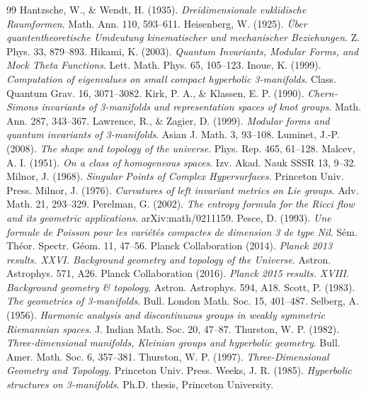 \documentclass[11pt,a4paper]{article}
\begin{document}
\begin{thebibliography}{99}
 Hantzsche, W., \& Wendt, H. (1935). \emph{Dreidimensionale euklidische Raumformen}. Math. Ann. 110, 593--611.
 Heisenberg, W. (1925). \emph{\"Uber quantentheoretische Umdeutung kinematischer und mechanischer Beziehungen}. Z. Phys. 33, 879--893.
 Hikami, K. (2003). \emph{Quantum Invariants, Modular Forms, and Mock Theta Functions}. Lett. Math. Phys. 65, 105--123.
 Inoue, K. (1999). \emph{Computation of eigenvalues on small compact hyperbolic 3-manifolds}. Class. Quantum Grav. 16, 3071--3082.
 Kirk, P. A., \& Klassen, E. P. (1990). \emph{Chern-Simons invariants of 3-manifolds and representation spaces of knot groups}. Math. Ann. 287, 343--367.
 Lawrence, R., \& Zagier, D. (1999). \emph{Modular forms and quantum invariants of 3-manifolds}. Asian J. Math. 3, 93--108.
 Luminet, J.-P. (2008). \emph{The shape and topology of the universe}. Phys. Rep. 465, 61--128.
 Malcev, A. I. (1951). \emph{On a class of homogeneous spaces}. Izv. Akad. Nauk SSSR 13, 9--32.
 Milnor, J. (1968). \emph{Singular Points of Complex Hypersurfaces}. Princeton Univ. Press.
 Milnor, J. (1976). \emph{Curvatures of left invariant metrics on Lie groups}. Adv. Math. 21, 293--329.
 Perelman, G. (2002). \emph{The entropy formula for the Ricci flow and its geometric applications}. arXiv:math/0211159.
 Pesce, D. (1993). \emph{Une formule de Poisson pour les vari\'et\'es compactes de dimension 3 de type Nil}. S\'em. Th\'eor. Spectr. G\'eom. 11, 47--56.
 Planck Collaboration (2014). \emph{Planck 2013 results. XXVI. Background geometry and topology of the Universe}. Astron. Astrophys. 571, A26.
 Planck Collaboration (2016). \emph{Planck 2015 results. XVIII. Background geometry \& topology}. Astron. Astrophys. 594, A18.
 Scott, P. (1983). \emph{The geometries of 3-manifolds}. Bull. London Math. Soc. 15, 401--487.
 Selberg, A. (1956). \emph{Harmonic analysis and discontinuous groups in weakly symmetric Riemannian spaces}. J. Indian Math. Soc. 20, 47--87.
 Thurston, W. P. (1982). \emph{Three-dimensional manifolds, Kleinian groups and hyperbolic geometry}. Bull. Amer. Math. Soc. 6, 357--381.
 Thurston, W. P. (1997). \emph{Three-Dimensional Geometry and Topology}. Princeton Univ. Press.
 Weeks, J. R. (1985). \emph{Hyperbolic structures on 3-manifolds}. Ph.D. thesis, Princeton University.
\end{thebibliography}
\end{document}
